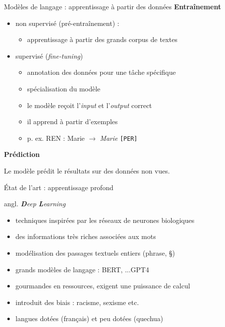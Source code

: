 \documentclass[xetex,xcolor={table,usenames,dvipsnames}]{beamer}
\newcommand{\bolder}[1]{{\color{purple}\bfseries#1}}
\begin{document}
\begin{frame}{Modèles de langage : apprentissage à partir des
		données}
	\bolder{Entraînement}
	\begin{itemize}
		\item non supervisé (pré-entraînement) :
		\begin{itemize}
			\item  apprentissage à partir des grands corpus de textes
		\end{itemize} 
		\item supervisé (\textit{fine-tuning})
		\begin{itemize}
			\item annotation des données pour une tâche spécifique \item spécialisation du modèle
			\item le modèle reçoit l'\textit{input} et l'\textit{output} correct
			\item il apprend à partir d'exemples
			\item p. ex. \textsc{REN} : Marie $\rightarrow$ \textit{Marie} \texttt{[PER]}
		\end{itemize}  
	\end{itemize}
	\bolder{Prédiction}
	
	Le modèle prédit le résultats sur des données non vues.
	
\end{frame}

\begin{frame}{État de l'art : apprentissage profond}
	
	{\scriptsize angl. \textit{\textit{\textbf{D}eep \textbf{L}earning}}}
	
	\begin{itemize}
		\item techniques inspirées par les réseaux de neurones biologiques
		\item des informations très riches associées aux mots 
		\item modélisation des passages textuels entiers (phrase, §)
		\item grands modèles de langage : \textsc{BERT}, ...\textsc{GPT4}
		\item gourmandes en ressources, exigent une puissance de calcul
		\item introduit des biais : racisme, sexisme etc.
		\item langues dotées (français) et peu dotées (quechua)
	\end{itemize}
	
	
	
\end{frame}
\end{document}
